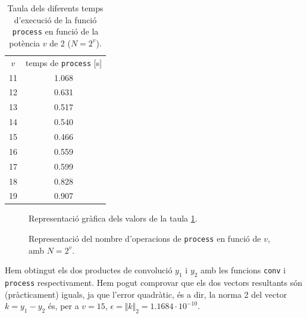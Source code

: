 \documentclass[11pt,a4]{article}
\numberwithin{equation}{section}
\theoremstyle{thmstyle}
\theoremstyle{thmstyle}
\theoremstyle{thmstyle}
\theoremstyle{thmstyle}
\theoremstyle{thmstyle}
\theoremstyle{thmstyle}
\theoremstyle{thmstyle}
\begin{document}
\begin{table}
\centering
\begin{tabular}{|c|c|}
\hline
$v$       & temps de {\tt process} [s]  \\
11        & 1.068             \\
12        & 0.631             \\
13        & 0.517             \\
14        & 0.540             \\
15        & 0.466             \\
16        & 0.559             \\
17        & 0.599             \\
18        & 0.828             \\
19        & 0.907             \\
\hline
\end{tabular}
\caption{Taula dels diferents temps d'execució de la funció {\tt process} en funció de la potència $v$ de 2 ($N = 2^v$).}
\label{tb:temps}
\end{table}

\begin{figure}[h]
\centering
{}
\caption{Representació gràfica dels valors de la taula \ref{tb:temps}.}
\label{fig:temps}
\end{figure}

\begin{figure}[h]
\centering
{}
\caption{Representació del nombre d'operacions de {\tt process} en funció de $v$, amb $N = 2^v$.}
\label{fig:teoric}
\end{figure}

Hem obtingut els dos productes de convolució $y_1$ i $y_2$ amb les funcions {\tt conv} i {\tt process} respectivament. Hem pogut comprovar que els dos vectors resultants són (pràcticament) iguals, ja que l'error quadràtic, és a dir, la norma 2 del vector $k = y_1 - y_2$ és, per a $v=15$, $\epsilon = \Vert k \Vert_2 = 1.1684 \cdot 10^{-10}$.
\end{document}
